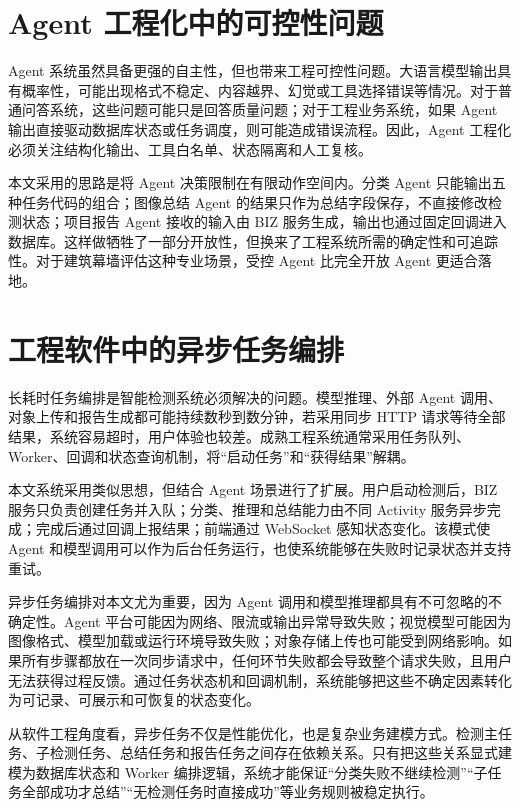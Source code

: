 \section{Agent 工程化中的可控性问题}
\label{sec:related-agent-control}

Agent 系统虽然具备更强的自主性，但也带来工程可控性问题。大语言模型输出具有概率性，可能出现格式不稳定、内容越界、幻觉或工具选择错误等情况。对于普通问答系统，这些问题可能只是回答质量问题；对于工程业务系统，如果 Agent 输出直接驱动数据库状态或任务调度，则可能造成错误流程。因此，Agent 工程化必须关注结构化输出、工具白名单、状态隔离和人工复核。

本文采用的思路是将 Agent 决策限制在有限动作空间内。分类 Agent 只能输出五种任务代码的组合；图像总结 Agent 的结果只作为总结字段保存，不直接修改检测状态；项目报告 Agent 接收的输入由 BIZ 服务生成，输出也通过固定回调进入数据库。这样做牺牲了一部分开放性，但换来了工程系统所需的确定性和可追踪性。对于建筑幕墙评估这种专业场景，受控 Agent 比完全开放 Agent 更适合落地。

\section{工程软件中的异步任务编排}
\label{sec:related-async-workflow}

长耗时任务编排是智能检测系统必须解决的问题。模型推理、外部 Agent 调用、对象上传和报告生成都可能持续数秒到数分钟，若采用同步 HTTP 请求等待全部结果，系统容易超时，用户体验也较差。成熟工程系统通常采用任务队列、Worker、回调和状态查询机制，将“启动任务”和“获得结果”解耦。

本文系统采用类似思想，但结合 Agent 场景进行了扩展。用户启动检测后，BIZ 服务只负责创建任务并入队；分类、推理和总结能力由不同 Activity 服务异步完成；完成后通过回调上报结果；前端通过 WebSocket 感知状态变化。该模式使 Agent 和模型调用可以作为后台任务运行，也使系统能够在失败时记录状态并支持重试。

异步任务编排对本文尤为重要，因为 Agent 调用和模型推理都具有不可忽略的不确定性。Agent 平台可能因为网络、限流或输出异常导致失败；视觉模型可能因为图像格式、模型加载或运行环境导致失败；对象存储上传也可能受到网络影响。如果所有步骤都放在一次同步请求中，任何环节失败都会导致整个请求失败，且用户无法获得过程反馈。通过任务状态机和回调机制，系统能够把这些不确定因素转化为可记录、可展示和可恢复的状态变化。

从软件工程角度看，异步任务不仅是性能优化，也是复杂业务建模方式。检测主任务、子检测任务、总结任务和报告任务之间存在依赖关系。只有把这些关系显式建模为数据库状态和 Worker 编排逻辑，系统才能保证“分类失败不继续检测”“子任务全部成功才总结”“无检测任务时直接成功”等业务规则被稳定执行。


